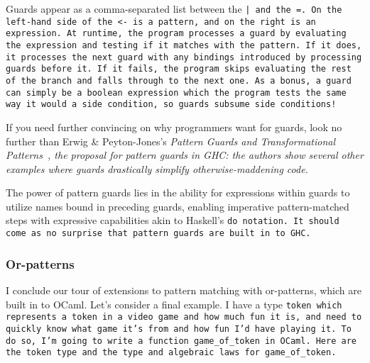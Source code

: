 \documentclass[manuscript,screen,review, 12pt, nonacm]{acmart}
\begin{document}
    Guards appear as a comma-separated list between the \tt{|} and the \tt{=}.
    On the left-hand side of the \tt{<-} is a pattern, and on the right is an
    expression. At runtime, the program processes a guard by evaluating the
    expression and testing if it matches with the pattern. If it does, it
    processes the next guard with any bindings introduced by processing guards
    before it. If it fails, the program skips evaluating the rest of the branch
    and falls through to the next one. As a bonus, a guard can simply be a
    boolean expression which the program tests the same way it would a side
    condition, so guards subsume side conditions! 
    
    If you need further convincing on why programmers want for guards, look no
    further than Erwig \& Peyton-Jones's \it{Pattern Guards and Transformational
    Patterns}~\cite{guardproposal}, the proposal for pattern guards in GHC: the
    authors show several other examples where guards drastically simplify
    otherwise-maddening code. 
    
    The power of pattern guards lies in the ability for expressions within
    guards to utilize names bound in preceding guards, enabling imperative
    pattern-matched steps with expressive capabilities akin to Haskell's \tt{do}
    notation. It should come as no surprise that pattern guards are built in to
    GHC. \nolinebreak
\subsubsection{Or-patterns}
    I conclude our tour of extensions to pattern matching with or-patterns,
    which are built in to OCaml. Let's consider a final example. I have a type
    \tt{token} which represents a token in a video game and how much fun it is,
    and need to quickly know what game it's from and how fun I'd have playing
    it. To do so, I'm going to write a function \tt{game\_of\_token} in OCaml.
    Here are the \tt{token} type and the type and algebraic laws for
    \tt{game\_of\_token}. 
\end{document}
